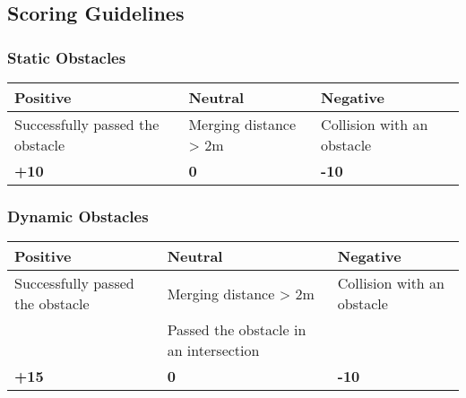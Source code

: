 {	\newpage

	\subsection{Scoring Guidelines}
	\label{obstacle_scoring_guidelines}

	\subsubsection*{Static Obstacles}
	\begin{table}[H]
		\begin{tabularx}{\textwidth}{XXX}
			\toprule
			\textbf{Positive}                & \textbf{Neutral}             & \textbf{Negative}          \\
			\midrule
			Successfully passed the obstacle & Merging distance > 2m        & Collision with an obstacle \\
			\topstrut
			\textbf{+10}                     & \textbf{0}                   & \textbf{-10}               \\
			\bottomrule
		\end{tabularx}
	\end{table}

	\subsubsection*{Dynamic Obstacles}
	\begin{table}[H]
		\begin{tabularx}{\textwidth}{XXX}
			\toprule
			\textbf{Positive}                & \textbf{Neutral}                        & \textbf{Negative}          \\
			\midrule
			Successfully passed the obstacle & Merging distance > 2m                   & Collision with an obstacle \\
			                                 & Passed the obstacle in an intersection  &                            \\
			\topstrut
			\textbf{+15}                     & \textbf{0}                              & \textbf{-10}               \\
			\bottomrule
		\end{tabularx}
	\end{table}

	\begin{highlight}

\end{highlight}}
